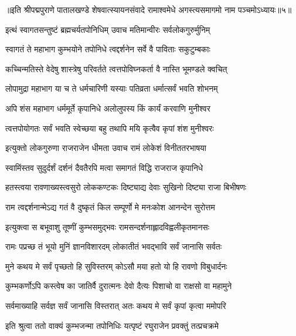 {॥इति श्रीपद्मपुराणे पातालखण्डे शेषवात्स्यायनसंवादे रामाश्वमेधे अगस्त्यसमागमो नाम पञ्चमोऽध्यायः॥५॥}



\twolineshloka
{इत्थं स्वागतसन्तुष्टं ब्रह्मचर्यतपोनिधिम्}
{उवाच मतिमान्वीरः सर्वलोकगुरुर्मुनिम्}%

\twolineshloka
{स्वागतं ते महाभाग कुम्भयोने तपोनिधे}
{त्वद्दर्शनेन सर्वे वै पाविताः सकुटुम्बकाः}%

\twolineshloka
{कच्चिन्मतिस्ते वेदेषु शास्त्रेषु परिवर्तते}
{त्वत्तपोविघ्नकर्ता वै नास्ति भूमण्डले क्वचित्}%

\twolineshloka
{लोपामुद्रा महाभाग या च ते धर्मचारिणी}
{यस्याः पतिव्रता धर्मात्सर्वं भवति शोभनम्}%

\twolineshloka
{अपि शंस महाभाग धर्ममूर्ते कृपानिधे}
{अलोलुपस्य किं कार्यं करवाणि मुनीश्वर}%

\twolineshloka
{त्वत्तपोयोगतः सर्वं भवति स्वेच्छया बहु}
{तथापि मयि कृत्वैव कृपां शंश मुनीश्वरः}%


\twolineshloka
{इत्युक्तो लोकगुरुणा राजराजेन धीमता}
{उवाच रामं लोकेशं विनीततरभाषया}%


\twolineshloka
{स्वामिंस्तव सुदुर्दर्शं दर्शनं दैवतैरपि}
{मत्वा समागतं विद्धि राजराज कृपानिधे}%

\twolineshloka
{हतस्त्वया रावणाख्यस्त्वसुरो लोककण्टकः}
{दिष्ट्याद्य देवाः सुखिनो दिष्ट्या राजा बिभीषणः}%

\twolineshloka
{राम त्वद्दर्शनान्मेऽद्य गतं वै दुष्कृतं किल}
{सम्पूर्णो मे मनःकोश आनन्देन सुरोत्तम}%

\twolineshloka
{इत्युक्त्वा स बभूवाशु तूष्णीं कुम्भसमुद्भवः}
{रामसन्दर्शनाह्लादविह्वलीकृतमानसः}%

\twolineshloka
{रामः पप्रच्छ तं भूयो मुनिं ज्ञानविशारदम्}
{लोकातीतं भवद्भावि सर्वं जानासि सर्वतः}%

\twolineshloka
{मुने कथय मे सर्वं पृच्छतो हि सुविस्तरम्}
{कोऽसौ मया हतो यो हि रावणो विबुधार्दनः}%

\twolineshloka
{कुम्भकर्णोऽपि कस्त्वेष का जातिर्वै दुरात्मनः}
{देवो दैत्यः पिशाचो वा राक्षसो वा महामुने}%

\twolineshloka
{सर्वमाख्याहि सर्वज्ञ सर्वं जानासि विस्तरात्}
{अतः कथय मे सर्वं कृपां कृत्वा ममोपरि}%

\twolineshloka
{इति श्रुत्वा ततो वाक्यं कुम्भजन्मा तपोनिधिः}
{यत्पृष्टं रघुराजेन प्रवक्तुं तत्प्रचक्रमे}%

